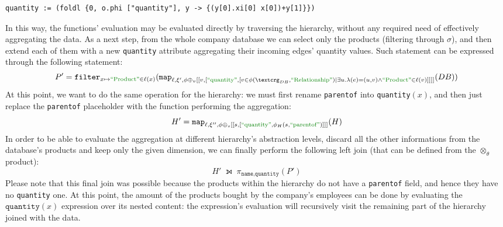 \begin{example}[continues=ex:inaggr]
\begin{lstlisting}[language=script,basicstyle=\ttfamily\scriptsize]
	quantity := (foldl {0, o.phi ["quantity"], y -> {(y[0].xi[0] x[0])+y[1]}})
\end{lstlisting}
In this way, the functions' evaluation may be evaluated directly by traversing the hierarchy, without any required need of effectively aggregating the data.
	As a next step, from the whole company database we can select only the products (filtering through $\sigma$), and then extend each of them with a new \texttt{quantity} attribute aggregating their incoming edges' quantity values. Such statement can be expressed through the following statement:
	\[P'=\texttt{filter}_{x\mapsto \mstr{Product}\in\ell(x)}(\texttt{map}_{\ell,\xi',\phi \oplus_v[[v, [\mstr{quantity}, [v\in \phi(\ngraph_{DB},\RELA)|\exists u.\lambda(e)=(u,v)\wedge \mstr{Product}\in\ell(v)]]]]}(DB))\]
	At this point, we want to do the same operation for the hierarchy: we must first rename \texttt{parentof} into \texttt{quantity}$(x)$, and then just replace the \texttt{parentof} placeholder with the function performing the aggregation:
	\[H'=\texttt{map}_{\ell,\xi'',\phi\oplus_s [[s, [\mstr{quantity},\phi_H(s,\mstr{parentof})]]]}(H)\]
	In order to be able to evaluate the aggregation at different hierarchy's abstraction levels, discard all the other informations from the database's products and keep only the given dimension, we can finally perform the following left join (that can be defined from the $\otimes_\theta$ product):
	\[H'\;\leftouterjoin\; \pi_{\texttt{name,quantity}}(P')\]
	Please note that this final join was possible because the products within the hierarchy do not have a \texttt{parentof} field, and hence they have no \texttt{quantity} one. At this point, the amount of the products bought by the company's employees can be done by evaluating the $\texttt{quantity}(x)$ expression over its nested content: the expression's evaluation will recursively visit the remaining part of the hierarchy joined with the data.
\end{example}

